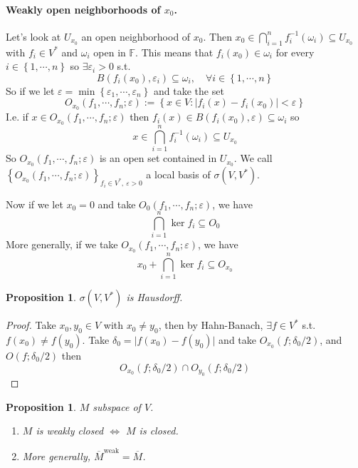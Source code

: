 \documentclass[11pt,a4paper]{article}
\theoremstyle{definition}
\theoremstyle{plain}
\newtheorem{proposition}[definition]{Proposition}
\theoremstyle{remark}
\newcommand{\F}{\mathbb{F}}
\renewcommand{\set}[1]{\left\{ #1 \right\}}
\newcommand{\abs}[1]{\lvert #1 \rvert}
\newcommand{\1}{\mathbbm{1}}
\begin{document}
\paragraph{Weakly open neighborhoods of $x_0$.} Let's look at $U_{x_0}$ an open neighborhood of $x_0$. Then 
$x_0 \in \bigcap_{i=1}^n f_i^{-1} (\omega_i) \subseteq U_{x_0}$ with $f_i \in V^*$ and $\omega_i$ open in $\F$. 
This means that $f_i(x_0) \in \omega_i$ for every $i \in \set{1, \cdots, n}$ so $\exists \varepsilon_i > 0$ s.t. 
$$B(f_i(x_0), \varepsilon_i) \subseteq \omega_i, \quad \forall i \in \set{1, \cdots, n}$$
So if we let $\varepsilon = \min \set{\varepsilon_1, \cdots, \varepsilon_n}$ and take the set 
$$O_{x_0} (f_1, \cdots, f_n; \varepsilon) := \set{x \in V \colon \abs{f_i(x) - f_i(x_0)} < \varepsilon}$$
I.e. if $x \in O_{x_0} (f_1, \cdots, f_n; \varepsilon)$ then $f_i(x) \in B(f_i(x_0), \varepsilon) \subseteq \omega_i$ so 
$$x \in \bigcap_{i=1}^n f_{i}^{-1} (\omega_i) \subseteq U_{x_0}$$
So $O_{x_0} (f_1, \cdots, f_n; \varepsilon)$ is an open set contained in $U_{x_0}$. We call $\set{O_{x_0}(f_1, \cdots, f_n; \varepsilon)}_{f_i \in V^*, \ \varepsilon > 0}$ 
a local basis of $\sigma(V, V^*)$. 

Now if we let $x_0 = 0$ and take $O_0(f_1, \cdots, f_n; \varepsilon)$, we have 
$$\bigcap_{i=1}^n \ker f_i \subseteq O_0$$
More generally, if we take $O_{x_0} (f_1, \cdots, f_n; \varepsilon)$, we have 
$$x_0 + \bigcap_{i=1}^n \ker f_i \subseteq O_{x_0}$$

\begin{proposition}
    $\sigma(V, V^*)$ is Hausdorff. 
\end{proposition}

\begin{proof}
    Take $x_0, y_0 \in V$ with $x_0 \ne y_0$, then by Hahn-Banach, $\exists f \in V^*$ s.t. $f(x_0) \ne f(y_0)$. Take $\delta_0 = \abs{f(x_0)-f(y_0)}$ and take 
    $O_{x_0} (f; \delta_0/2)$, and $O(f; \delta_0/2)$ then 
    $$O_{x_0} (f; \delta_0/2) \cap O_{y_0}(f; \delta_0/2)$$     
\end{proof}

\begin{proposition}
    $M$ subspace of $V$. 
    \begin{enumerate}
        \item $M$ is weakly closed $\iff$ $M$ is closed. 
        \item More generally, $\overline{M}^{\text{weak}} = \overline{M}$. 
    \end{enumerate}
\end{proposition}
\end{document}
